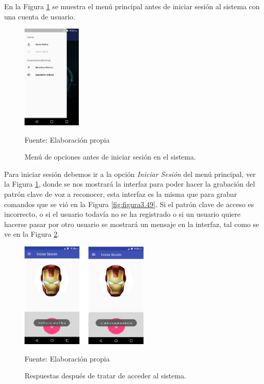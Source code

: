 En la Figura \ref{fig:figura3.53} se muestra el menú principal antes de iniciar sesión al sistema con una cuenta de usuario.
\begin{figure}[H]
\captionsetup{justification=centering}
\begin{center}
\includegraphics[width=0.25\textwidth]{Imagenes/Cap3/image053}
\end{center}
\begin{center}
\vskip -0.5cm
\caption{\small{Menú de opciones antes de iniciar sesión en el sistema.}}
\label{fig:figura3.53}
{\small{Fuente: Elaboración propia}}
\end{center}
\end{figure}

Para iniciar sesión debemos ir a la opción \textit{Iniciar Sesión} del menú principal, ver la Figura \ref{fig:figura3.53}, donde se nos mostrará la interfaz para poder hacer la grabación del patrón clave de voz a reconocer, esta interfaz es la misma que para grabar comandos que se vió en la Figura \ref{fig:figura3.49}. Si el patrón clave de acceso es incorrecto, o si el usuario todavía no se ha registrado o si un usuario quiere hacerse pasar por otro usuario se mostrará un mensaje en la interfaz, tal como se ve en la Figura \ref{fig:figura3.54}.
\begin{figure}[H]
\captionsetup{justification=centering}
\begin{center}
\includegraphics[width=0.55\textwidth]{Imagenes/Cap3/image054}
\end{center}
\begin{center}
\vskip -0.5cm
\caption{\small{Respuestas después de tratar de acceder al sistema.}}
\label{fig:figura3.54}
{\small{Fuente: Elaboración propia}}
\end{center}
\end{figure}

